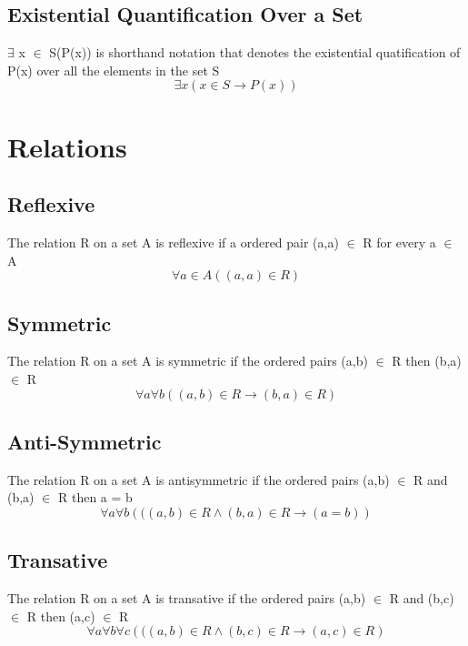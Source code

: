 \documentclass[12pt]{article}
\begin{document}
\subsection{Existential Quantification Over a Set}
$\exists$ x $\in$ S(P(x)) is shorthand notation that denotes
the existential quatification of P(x) over all the elements in the set S
\begin{equation}
\exists x \left( x \in S \rightarrow P(x) \right)
\end{equation}


%
%
%
%
%
%
\pagebreak
\section{Relations}
\setcounter{equation}{0}

\subsection{Reflexive}
The relation R on a set A is reflexive 
if a ordered pair (a,a) $\in$ R for every a $\in$ A
\begin{equation}
\forall a \in A((a,a) \in R)
\end{equation}

\subsection{Symmetric}
The relation R on a set A is symmetric 
if the ordered pairs (a,b) $\in$ R 
then (b,a) $\in$ R
\begin{equation}
\forall a \forall b \left((a,b)\in R \rightarrow (b,a)\in R \right)
\end{equation}

\subsection{Anti-Symmetric}
The relation R on a set A is antisymmetric 
if the ordered pairs (a,b) $\in$ R 
and (b,a) $\in$ R 
then a = b
\begin{equation}
\forall a \forall b \left(( (a,b)\in R \wedge (b,a)\in R \rightarrow (a = b) \right)
\end{equation}

\subsection{Transative}
The relation R on a set A is transative 
if the ordered pairs (a,b) $\in$ R 
and (b,c) $\in$ R 
then (a,c) $\in$ R
\begin{equation}
\forall a \forall b \forall c \left(( (a,b)\in R \wedge (b,c)\in R \rightarrow (a,c) \in R \right)
\end{equation}
\end{document}
